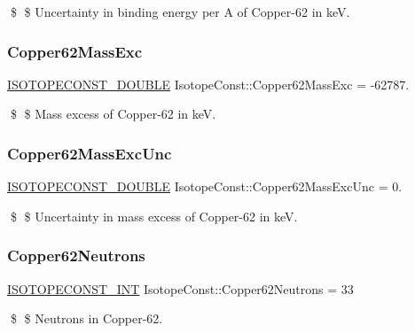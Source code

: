 \$ \$ Uncertainty in binding energy per A of Copper-\/62 in keV. \mbox{\label{group___isotope_const-_copper-_cu62_gae508e7a4399cb0e41e9f69ec5ef3fe27}} 
\subsubsection{\texorpdfstring{Copper62\+Mass\+Exc}{Copper62MassExc}}
{\footnotesize\ttfamily \mbox{\hyperlink{group___isotope_const-_macros_ga8f45a7272ce02c0b4c65c44636ed719a}{I\+S\+O\+T\+O\+P\+E\+C\+O\+N\+S\+T\+\_\+\+D\+O\+U\+B\+LE}} Isotope\+Const\+::\+Copper62\+Mass\+Exc = -\/62787.}

\$ \$ Mass excess of Copper-\/62 in keV. \mbox{\label{group___isotope_const-_copper-_cu62_ga7a3ccc57545f230955bf64e5473d781a}} 
\subsubsection{\texorpdfstring{Copper62\+Mass\+Exc\+Unc}{Copper62MassExcUnc}}
{\footnotesize\ttfamily \mbox{\hyperlink{group___isotope_const-_macros_ga8f45a7272ce02c0b4c65c44636ed719a}{I\+S\+O\+T\+O\+P\+E\+C\+O\+N\+S\+T\+\_\+\+D\+O\+U\+B\+LE}} Isotope\+Const\+::\+Copper62\+Mass\+Exc\+Unc = 0.}

\$ \$ Uncertainty in mass excess of Copper-\/62 in keV. \mbox{\label{group___isotope_const-_copper-_cu62_gac92b23aec9b50d2aa904d5bc44878802}} 
\subsubsection{\texorpdfstring{Copper62\+Neutrons}{Copper62Neutrons}}
{\footnotesize\ttfamily \mbox{\hyperlink{group___isotope_const-_macros_ga5f18360b3e99483a35c32d789e62621c}{I\+S\+O\+T\+O\+P\+E\+C\+O\+N\+S\+T\+\_\+\+I\+NT}} Isotope\+Const\+::\+Copper62\+Neutrons = 33}

\$ \$ Neutrons in Copper-\/62. \mbox{\label{group___isotope_const-_copper-_cu62_gabe292d08e646b37982084e8f098653de}} 
